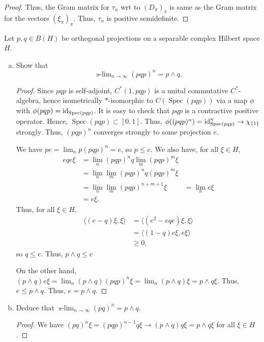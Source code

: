 \documentclass{article}
\DeclareMathOperator{\Spec}{Spec}
\DeclareMathOperator{\slim}{s-lim}
\begin{document}
\begin{proof}
Thus, the Gram matrix for $\tau_n$ wrt to $(D_\pi)_\pi$ is same as the Gram matrix for the vectors $(\xi_\pi)_\pi$. Thus, $\tau_n$ is positive semidefinite.
\end{proof}
  
   Let $p,q \in B(H)$ be orthogonal projections on a separable complex Hilbert space $H$.
  \begin{enumerate}[(a)]
  \item Show that
    $$\slim_{n \to \infty} (pqp)^n = p \wedge q.$$
    \begin{proof}
      Since $pqp$ is self-adjoint, $C^*(1, pqp)$ is a unital commutative $C^*$-algebra, hence isometrically $*$-isomorphic to $C(\Spec(pqp))$ via a map $\phi$ with $\phi(pqp) = \id_{\Spec(pqp)}$.  It is easy to check that $pqp$ is a contractive positive operator. Hence, $\Spec(pqp) \subset [0,1]$.  Thus, $\phi((pqp)^n) = \id_{\Spec(pqp)}^n \to \chi_{\{1\}}$ strongly.  Thus, $(pqp)^n$ converges strongly to some projection $e$.


      We have $pe = \lim_n p (pqp)^n = e$, so $p \le e$.  We also have, for all $\xi \in H$,
      \begin{align*}
        eqe \xi & = \lim_n (pqp)^n q \lim_m (pqp)^m \xi  \\
        & = \lim_n \lim_m (pqp)^n q (pqp)^m \xi \\
        & = \lim_{n} \lim_m (pqp)^{n + m + 1} \xi \
        & = \lim_n e \xi \\
        & = e \xi.
      \end{align*}
      Thus, for all $\xi \in H$,
      \begin{align*}
        \langle (e - q)\xi,  \xi \rangle & = \langle (e^2 - eqe) \xi,  \xi \rangle \\
        & = \langle (1 - q) e \xi, e \xi \rangle \\
        & \ge 0,
      \end{align*}
      so $q \le e$.  Thus, $p \wedge q \le e$

      On the other hand, $(p \wedge q) e \xi = \lim_n (p \wedge q) (pqp)^n \xi = \lim_n (p \wedge q) \xi = p \wedge q \xi$.  Thus,
      $e \le p \wedge q$.  Thus, $e = p \wedge q$.
    \end{proof}

  \item Deduce that $\slim_{n \to \infty} (pq)^n = p \wedge q$.
    \begin{proof}
      We have $(pq)^n \xi = (pqp)^{n-1}q \xi \to (p \wedge q) q \xi = p \wedge q \xi$ for all $\xi \in H$.
    \end{proof}


\end{enumerate}
\end{document}
